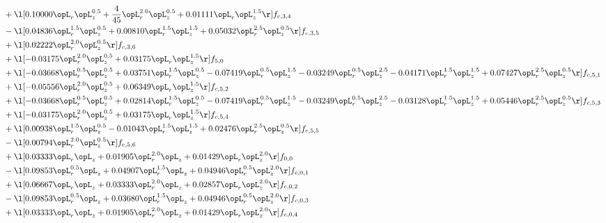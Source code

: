 \begin{alignat}{2}
& + \l[  0.10000 \opL_r \opL_z^{0.5} + \frac{4}{45} \opL_r^{2.0} \opL_z^{0.5} +  0.01111 \opL_r \opL_z^{1.5}  \r] f_{c,3,4} \nonumber \\ 
& - \l[  0.04836 \opL_r^{1.5} \opL_z^{0.5} +  0.00810 \opL_r^{1.5} \opL_z^{1.5} +  0.05032 \opL_r^{2.5} \opL_z^{0.5}  \r] f_{c,3,5} \nonumber \\ 
& + \l[  0.02222 \opL_r^{2.0} \opL_z^{0.5}  \r] f_{c,3,6} \nonumber \\ 
& + \l[  -0.03175 \opL_r^{2.0} \opL_z^{0.5} +  0.03175 \opL_r \opL_z^{1.5}  \r] f_{5,0} \nonumber \\ 
& + \l[  -0.03668 \opL_r^{0.5} \opL_z^{0.5} +  0.03751 \opL_r^{1.5} \opL_z^{0.5}   -0.07419 \opL_r^{0.5} \opL_z^{1.5}   -0.03249 \opL_r^{0.5} \opL_z^{2.5}   -0.04171 \opL_r^{1.5} \opL_z^{1.5} +  0.07427 \opL_r^{2.5} \opL_z^{0.5}  \r] f_{c,5,1} \nonumber \\ 
& + \l[  -0.05556 \opL_r^{2.0} \opL_z^{0.5} +  0.06349 \opL_r \opL_z^{1.5}  \r] f_{c,5,2} \nonumber \\ 
& + \l[  -0.03668 \opL_r^{0.5} \opL_z^{0.5} +  0.02814 \opL_r^{1.5} \opL_z^{0.5}   -0.07419 \opL_r^{0.5} \opL_z^{1.5}   -0.03249 \opL_r^{0.5} \opL_z^{2.5}   -0.03128 \opL_r^{1.5} \opL_z^{1.5} +  0.05446 \opL_r^{2.5} \opL_z^{0.5}  \r] f_{c,5,3} \nonumber \\ 
& + \l[  -0.03175 \opL_r^{2.0} \opL_z^{0.5} +  0.03175 \opL_r \opL_z^{1.5}  \r] f_{c,5,4} \nonumber \\ 
& + \l[  0.00938 \opL_r^{1.5} \opL_z^{0.5}   -0.01043 \opL_r^{1.5} \opL_z^{1.5} +  0.02476 \opL_r^{2.5} \opL_z^{0.5}  \r] f_{c,5,5} \nonumber \\ 
& - \l[  0.00794 \opL_r^{2.0} \opL_z^{0.5}  \r] f_{c,5,6} \nonumber \\ 
& + \l[  0.03333 \opL_r \opL_z +  0.01905 \opL_r^{2.0} \opL_z +  0.01429 \opL_r \opL_z^{2.0}  \r] f_{0,0} \nonumber \\ 
& - \l[  0.09853 \opL_r^{0.5} \opL_z +  0.04907 \opL_r^{1.5} \opL_z +  0.04946 \opL_r^{0.5} \opL_z^{2.0}  \r] f_{c,0,1} \nonumber \\ 
& + \l[  0.06667 \opL_r \opL_z +  0.03333 \opL_r^{2.0} \opL_z +  0.02857 \opL_r \opL_z^{2.0}  \r] f_{c,0,2} \nonumber \\ 
& - \l[  0.09853 \opL_r^{0.5} \opL_z +  0.03680 \opL_r^{1.5} \opL_z +  0.04946 \opL_r^{0.5} \opL_z^{2.0}  \r] f_{c,0,3} \nonumber \\ 
& + \l[  0.03333 \opL_r \opL_z +  0.01905 \opL_r^{2.0} \opL_z +  0.01429 \opL_r \opL_z^{2.0}  \r] f_{c,0,4} \nonumber \\ 

\end{alignat}
